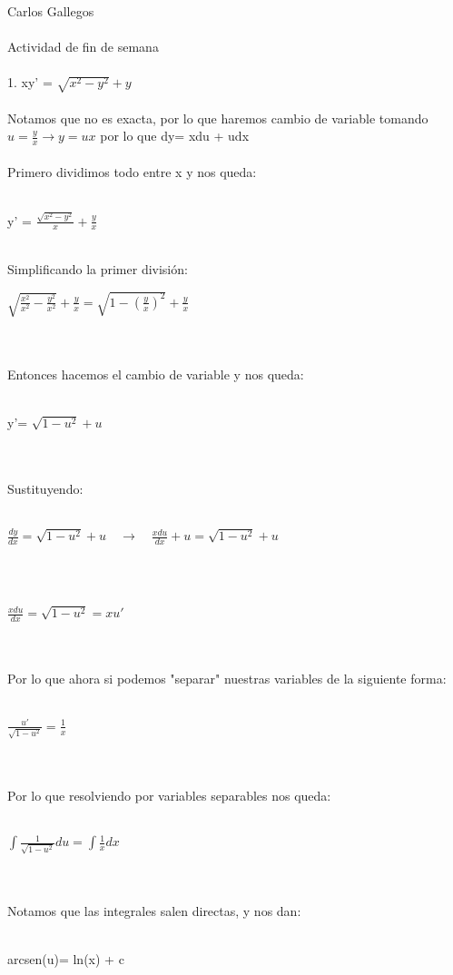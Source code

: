 \documentclass[a4paper,10pt]{article}
\title{}
\author{}
\date{}
\begin{document}
\maketitle
Carlos Gallegos\\\\
Actividad de fin de semana\\\\
1. xy' = $\sqrt{x^2-y^2} + y$ \\\\
Notamos que no es exacta, por lo que haremos cambio de variable tomando $u=\frac{y}{x} \rightarrow y=ux$ por lo que dy= xdu + udx\\\\
Primero dividimos todo entre x y nos queda:\\\
\centerline{y' = $\frac{\sqrt{x^2 - y^2}}{x} + \frac{y}{x} $}\\
Simplificando la primer división:\\
\centerline{$\sqrt{\frac{x^2}{x^2}-\frac{y^2}{x^2}} + \frac{y}{x}= \sqrt{1-(\frac{y}{x})^2} + \frac{y}{x}$}\\\\
Entonces hacemos el cambio de variable y nos queda:\\\\
\centerline{y'= $ \sqrt{1-u^2} + u$ }\\\\
Sustituyendo:\\\\
\centerline{$\frac{dy}{dx}=  \sqrt{1-u^2} + u \quad \rightarrow \quad \frac{xdu}{dx} + u = \sqrt{1-u^2} + u$}\\\\
\centerline{$\frac{xdu}{dx} = \sqrt{1-u^2} = x u'$}\\\\
Por lo que ahora si podemos "separar" nuestras variables de la siguiente forma:\\\\
\centerline{$\frac{u'}{\sqrt{1-u^2}}  = \frac{1}{x}$}\\\\
Por lo que resolviendo por variables separables nos queda:\\\\
\centerline{$\int \frac{1}{\sqrt{1-u^2}} du= \int \frac{1}{x} dx$}\\\\
Notamos que las integrales salen directas, y nos dan:\\\\
\centerline{arcsen(u)= ln(x) + c}\\\\
\end{document}
